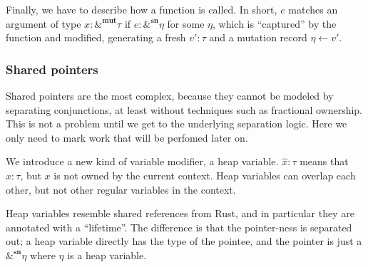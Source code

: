 \documentclass[acmsmall,nonacm]{acmart}
\newcommand{\core}[1]{\left| #1 \right|}
\newcommand{\proves}{\vdash}
\newcommand{\makes}{\dashv}
\newcommand*{\axiom}[2][]{\infer[#1]{}{#2}}
\begin{document}
Finally, we have to describe how a function is called. In short, $e$ matches an argument of type $x:\&^\mathbf{mut}\tau$ if $e:\&^\mathbf{sn}\eta$ for some $\eta$, which is ``captured'' by the function and modified, generating a fresh $v':\tau$ and a mutation record $\eta\gets v'$.

\subsubsection{Shared pointers}

Shared pointers are the most complex, because they cannot be modeled by separating conjunctions, at least without techniques such as fractional ownership. This is not a problem until we get to the underlying separation logic. Here we only need to mark work that will be perfomed later on.

We introduce a new kind of variable modifier, a heap variable. $\hat x:\tau$ means that $x:\tau$, but $x$ is not owned by the current context. Heap variables can overlap each other, but not other regular variables in the context.

Heap variables resemble shared references from Rust, and in particular they are annotated with a ``lifetime''. The difference is that the pointer-ness is separated out; a heap variable directly has the type of the pointee, and the pointer is just a $\&^\mathbf{sn}\eta$ where $\eta$ is a heap variable.

\end{document}
